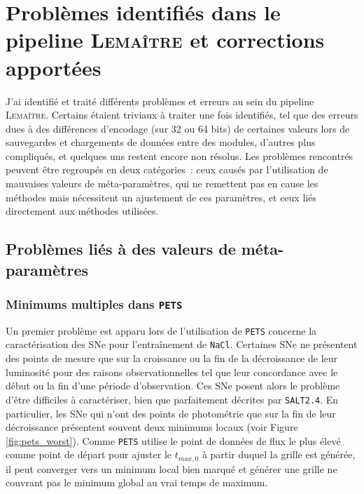 \documentclass{book}
\def\lemaitre{\textsc{Lemaître}\xspace}
\def\pets{\texttt{PETS}\xspace}
\def\nacl{\texttt{NaCl}\xspace}
\def\saltd{\texttt{SALT2.4}\xspace}
\begin{document}
\section{Problèmes identifiés dans le pipeline \lemaitre et corrections apportées}

J'ai identifié et traité différents problèmes et erreurs au sein du pipeline \lemaitre. Certains étaient triviaux à traiter une fois identifiés, tel que des erreurs dues à des différences d'encodage (sur 32 ou 64 bits) de certaines valeurs lors de sauvegardes et chargements de données entre des modules, d'autres plus compliqués, et quelques uns restent encore non résolus. Les problèmes rencontrés peuvent être regroupés en deux catégories~: ceux causés par l'utilisation de mauvaises valeurs de méta-paramètres, qui ne remettent pas en cause les méthodes mais nécessitent un ajustement de ces paramètres, et ceux liés directement aux méthodes utilisées.

\subsection{Problèmes liés à des valeurs de méta-paramètres}

\subsubsection{Minimums multiples dans \pets}
\label{sec:min_mult}

Un premier problème est apparu lors de l'utilisation de \pets concerne la caractérisation des SNe pour l'entraînement de \nacl. Certaines SNe ne présentent des points de mesure que sur la croissance ou la fin de la décroissance de leur luminosité pour des raisons observationnelles tel que leur concordance avec le début ou la fin d'une période d'observation. Ces SNe posent alors le problème d'être difficiles à caractériser, bien que parfaitement décrites par \saltd. En particulier, les SNe qui n'ont des points de photométrie que sur la fin de leur décroissance présentent souvent deux minimums locaux (voir Figure \ref{fig:pets_worst}). Comme \pets utilise le point de données de flux le plus élevé comme point de départ pour ajuster le $t_{max, 0}$ à partir duquel la grille est générée, il peut converger vers un minimum local bien marqué et générer une grille ne couvrant pas le minimum global au vrai temps de maximum.
\end{document}
